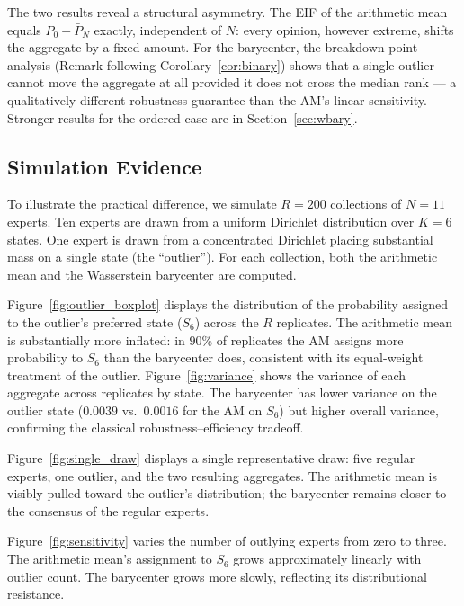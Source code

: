 The two results reveal a structural asymmetry.  The EIF of the arithmetic mean equals $P_0 - \bar{P}_N$ exactly, independent of $N$: every opinion, however extreme, shifts the aggregate by a fixed amount.  For the barycenter, the breakdown point analysis (Remark following Corollary~\ref{cor:binary}) shows that a single outlier cannot move the aggregate at all provided it does not cross the median rank --- a qualitatively different robustness guarantee than the AM's linear sensitivity.  Stronger results for the ordered case are in Section~\ref{sec:wbary}.

\subsection{Simulation Evidence}

To illustrate the practical difference, we simulate $R = 200$ collections of $N = 11$ experts.  Ten experts are drawn from a uniform Dirichlet distribution over $K = 6$ states.  One expert is drawn from a concentrated Dirichlet placing substantial mass on a single state (the ``outlier'').  For each collection, both the arithmetic mean and the Wasserstein barycenter are computed.

Figure~\ref{fig:outlier_boxplot} displays the distribution of the probability assigned to the outlier's preferred state ($S_6$) across the $R$ replicates.  The arithmetic mean is substantially more inflated: in $90\%$ of replicates the AM assigns more probability to $S_6$ than the barycenter does, consistent with its equal-weight treatment of the outlier.  Figure~\ref{fig:variance} shows the variance of each aggregate across replicates by state.  The barycenter has lower variance on the outlier state ($0.0039$ vs.\ $0.0016$ for the AM on $S_6$) but higher overall variance, confirming the classical robustness--efficiency tradeoff.

Figure~\ref{fig:single_draw} displays a single representative draw: five regular experts, one outlier, and the two resulting aggregates.  The arithmetic mean is visibly pulled toward the outlier's distribution; the barycenter remains closer to the consensus of the regular experts.

Figure~\ref{fig:sensitivity} varies the number of outlying experts from zero to three.  The arithmetic mean's assignment to $S_6$ grows approximately linearly with outlier count.  The barycenter grows more slowly, reflecting its distributional resistance.

